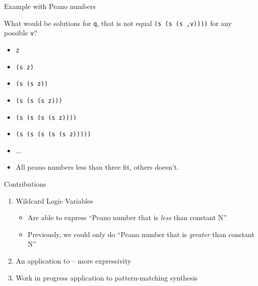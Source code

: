 \documentclass[aspectratio=169
  , xcolor={svgnames}
  , hyperref=
      { colorlinks
      , urlcolor=DarkBlue
      }
  , russian  %
  ]{beamer}
\begin{document}
\begin{frame}{Example with Peano numbers}

What would be solutions for \texttt{q}, that is not equal \texttt{(s (s (s ,v))))} for any possible \texttt{v}?

\begin{itemize}
\item[\faGood] \texttt{z}
\item[\faGood] \texttt{(s z)}
\item[\faGood] \texttt{(s (s z))}
\item[\faBad] \texttt{(s (s (s z)))}
\item[\faBad] \texttt{(s (s (s (s z))))}
\item[\faBad] \texttt{(s (s (s (s (s z)))))}
\item ...
\item All peano numbers less than three fit, others doesn't.
\end{itemize}
\end{frame}

\begin{frame}{Contributions}
\begin{enumerate}
\item Wildcard Logic Variables
\begin{itemize}
\item Are able to express ``Peano number that is \emph{less} than constant N''
\item Previously, we could only do ``Peano number that is  \emph{greater} than constant N''
\end{itemize}
\item An application to \noCanren{} -- more expressivity
\item Work in progress application to pattern-matching synthesis
\end{enumerate}
\end{frame}
\end{document}
